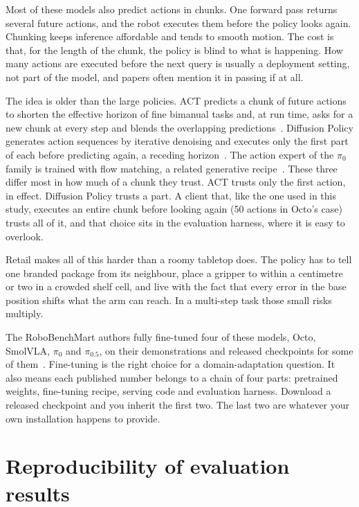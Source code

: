 Most of these models also predict actions in chunks. One forward pass returns several future actions, and the robot executes them before the policy looks again. Chunking keeps inference affordable and tends to smooth motion. The cost is that, for the length of the chunk, the policy is blind to what is happening. How many actions are executed before the next query is usually a deployment setting, not part of the model, and papers often mention it in passing if at all.

The idea is older than the large policies. ACT predicts a chunk of future actions to shorten the effective horizon of fine bimanual tasks and, at run time, asks for a new chunk at every step and blends the overlapping predictions~\cite{zhao2023act}. Diffusion Policy generates action sequences by iterative denoising and executes only the first part of each before predicting again, a receding horizon~\cite{chi2023diffusionpolicy}. The action expert of the $\pi_0$ family is trained with flow matching, a related generative recipe~\cite{lipman2023flow,black2024pi0visionlanguageactionflowmodel}. These three differ most in how much of a chunk they trust. ACT trusts only the first action, in effect. Diffusion Policy trusts a part. A client that, like the one used in this study, executes an entire chunk before looking again (50 actions in Octo's case) trusts all of it, and that choice sits in the evaluation harness, where it is easy to overlook.

Retail makes all of this harder than a roomy tabletop does. The policy has to tell one branded package from its neighbour, place a gripper to within a centimetre or two in a crowded shelf cell, and live with the fact that every error in the base position shifts what the arm can reach. In a multi-step task those small risks multiply.

The RoboBenchMart authors fully fine-tuned four of these models, Octo, SmolVLA, $\pi_0$ and $\pi_{0.5}$, on their demonstrations and released checkpoints for some of them~\cite{soshin2025robobenchmart}. Fine-tuning is the right choice for a domain-adaptation question. It also means each published number belongs to a chain of four parts: pretrained weights, fine-tuning recipe, serving code and evaluation harness. Download a released checkpoint and you inherit the first two. The last two are whatever your own installation happens to provide.

\section{Reproducibility of evaluation results}

